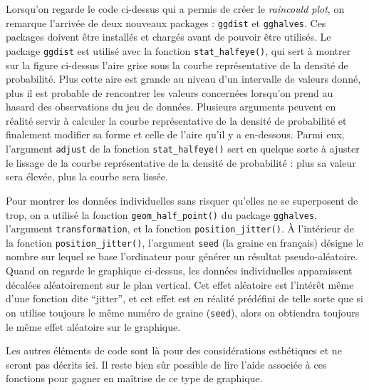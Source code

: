 \documentclass[
  french,
]{book}
\begin{document}
Lorsqu'on regarde le code ci-dessus qui a permis de créer le \emph{raincould plot}, on remarque l'arrivée de deux nouveaux packages : \texttt{ggdist} et \texttt{gghalves}. Ces packages doivent être installés et chargés avant de pouvoir être utilisés. Le package \texttt{ggdist} est utilisé avec la fonction \texttt{stat\_halfeye()}, qui sert à montrer sur la figure ci-dessus l'aire grise sous la courbe représentative de la densité de probabilité. Plus cette aire est grande au niveau d'un intervalle de valeurs donné, plus il est probable de rencontrer les valeurs concernées lorsqu'on prend au hasard des observations du jeu de données. Plusieurs arguments peuvent en réalité servir à calculer la courbe représentative de la densité de probabilité et finalement modifier sa forme et celle de l'aire qu'il y a en-dessous. Parmi eux, l'argument \texttt{adjust} de la fonction \texttt{stat\_halfeye()} sert en quelque sorte à ajuster le lissage de la courbe représentative de la densité de probabilité : plus sa valeur sera élevée, plus la courbe sera lissée.

Pour montrer les données individuelles sans risquer qu'elles ne se superposent de trop, on a utilisé la fonction \texttt{geom\_half\_point()} du package \texttt{gghalves}, l'argument \texttt{transformation}, et la fonction \texttt{position\_jitter()}. À l'intérieur de la fonction \texttt{position\_jitter()}, l'argument \texttt{seed} (la graine en français) désigne le nombre sur lequel se base l'ordinateur pour générer un résultat pseudo-aléatoire. Quand on regarde le graphique ci-dessus, les données individuelles apparaissent décalées aléatoirement sur le plan vertical. Cet effet aléatoire est l'intérêt même d'une fonction dite ``jitter'', et cet effet est en réalité prédéfini de telle sorte que si on utilise toujours le même numéro de graine (\texttt{seed}), alors on obtiendra toujours le même effet aléatoire sur le graphique.

Les autres éléments de code sont là pour des considérations esthétiques et ne seront pas décrits ici. Il reste bien sûr possible de lire l'aide associée à ces fonctions pour gagner en maîtrise de ce type de graphique.
\end{document}
